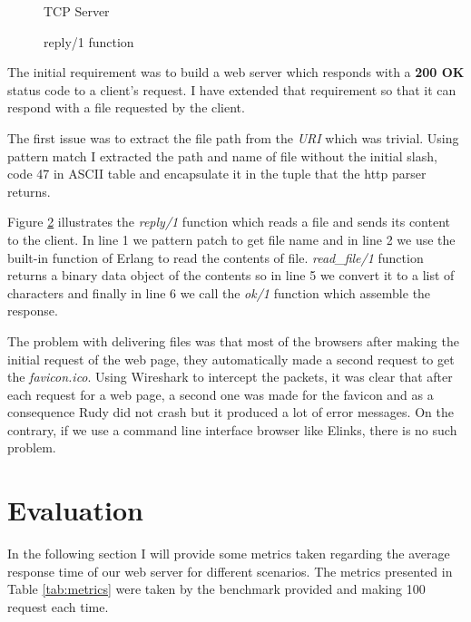 \documentclass[a4paper]{article}
\begin{document}
\begin{figure}
    
    \caption{TCP Server}
    \label{fig:tcp_server}
\end{figure}

\begin{figure}
    
    \caption{reply/1 function}
    \label{fig:reply}
\end{figure}

The initial requirement was to build a web server which responds with a
\textbf{200 OK} status code to a client's request. I have extended that
requirement so that it can respond with a file requested by the client.

The first issue was to extract the file path from the \textit{URI} which was
trivial. Using pattern match I extracted the path and name of file without the
initial slash, code 47 in ASCII table and encapsulate it in the tuple that the
http parser returns.

Figure \ref{fig:reply} illustrates the \emph{reply/1} function which reads a
file and sends its content to the client. In line 1 we pattern patch to get
file name and in line 2 we use the built-in function of Erlang to read the
contents of file. \emph{read\_file/1} function returns a binary data object of
the contents so in line 5 we convert it to a list of characters and finally in
line 6 we call the \emph{ok/1} function which assemble the response.

The problem with delivering files was that most of the browsers after making
the initial request of the web page, they automatically made a second request to
get the \emph{favicon.ico}. Using Wireshark to intercept the packets, it was
clear that after each request for a web page, a second one was made for the
favicon and as a consequence Rudy did not crash but it produced a lot of error
messages. On the contrary, if we use a command line interface browser like
Elinks, there is no such problem.

\section{Evaluation}

In the following section I will provide some metrics taken regarding the average
response time of our web server for different scenarios. The metrics presented
in Table \ref{tab:metrics} were taken by the benchmark provided and making 100
request each time.
\end{document}
